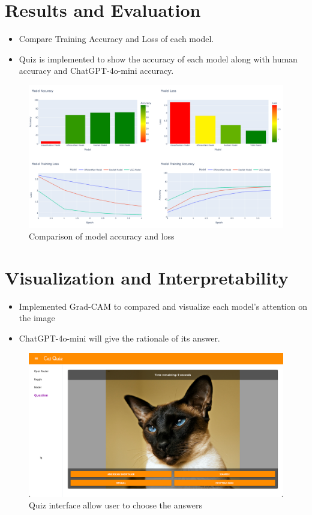 \documentclass{article}
\begin{document}
\section{Results and Evaluation}
\begin{itemize}
    \item Compare Training Accuracy and Loss of each model.
    \item Quiz is implemented to show the accuracy of each model along with human accuracy and ChatGPT-4o-mini accuracy.
\end{itemize}

\begin{figure}[H]
    \centering
    \includegraphics[width=\textwidth]{models.png}
    \caption{Comparison of model accuracy and loss}
    \label{fig:models}
\end{figure}

\section{Visualization and Interpretability}
\begin{itemize}
    \item Implemented Grad-CAM to compared and visualize each model's attention on the image
    \item ChatGPT-4o-mini will give the rationale of its answer.
\end{itemize}

\begin{figure}[H]
    \centering
    \includegraphics[width=\textwidth]{quiz.png}
    \caption{Quiz interface allow user to choose the answers}
    \label{fig:quiz}
\end{figure}
\end{document}
